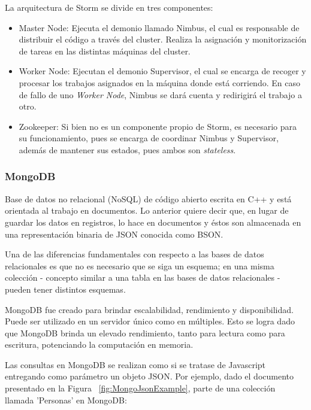 La arquitectura de Storm se divide en tres componentes:
\begin{itemize}
\item Master Node: Ejecuta el demonio llamado Nimbus, el cual es responsable de distribuir el código a través del cluster. Realiza la asignación y monitorización de tareas en las distintas máquinas del cluster.
\item Worker Node: Ejecutan el demonio Supervisor, el cual se encarga de recoger y procesar los trabajos asignados en la máquina donde está corriendo. En caso de fallo de uno \textit{Worker Node}, Nimbus se dará cuenta y redirigirá el trabajo a otro.
\item Zookeeper: Si bien no es un componente propio de Storm, es necesario para su funcionamiento, pues se encarga de coordinar Nimbus y Supervisor, además de mantener sus estados, pues ambos son \textit{stateless}.
\end{itemize}

\subsubsection{MongoDB}
\label{subsubsec:mongoDB}

Base de datos no relacional (NoSQL) de código abierto escrita en C++ y está orientada al trabajo en documentos. Lo anterior quiere decir que, en lugar de guardar los datos en registros, lo hace en documentos y éstos son almacenada en una representación binaria de JSON conocida como BSON.

Una de las diferencias fundamentales con respecto a las bases de datos relacionales es que no es necesario que se siga un esquema; en una misma colección - concepto similar a una tabla en las bases de datos relacionales - pueden tener distintos esquemas.

MongoDB fue creado para brindar escalabilidad, rendimiento y disponibilidad. Puede ser utilizado en un servidor único como en múltiples. Esto se logra dado que MongoDB brinda un elevado rendimiento, tanto para lectura como para escritura, potenciando la computación en memoria.

Las consultas en MongoDB se realizan como si se tratase de Javascript entregando como parámetro un objeto JSON. Por ejemplo, dado el documento presentado en la Figura ~\ref{fig:MongoJsonExample}, parte de una colección llamada 'Personas' en MongoDB:

